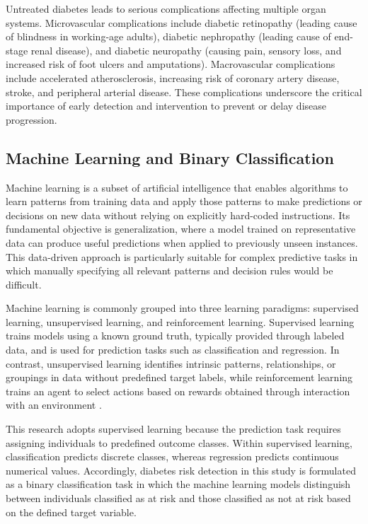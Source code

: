 Untreated diabetes leads to serious complications affecting multiple organ systems. Microvascular complications include diabetic retinopathy (leading cause of blindness in working-age adults), diabetic nephropathy (leading cause of end-stage renal disease), and diabetic neuropathy (causing pain, sensory loss, and increased risk of foot ulcers and amputations). Macrovascular complications include accelerated atherosclerosis, increasing risk of coronary artery disease, stroke, and peripheral arterial disease. These complications underscore the critical importance of early detection and intervention to prevent or delay disease progression.

\subsection{Machine Learning and Binary Classification}

Machine learning is a subset of artificial intelligence that enables algorithms to learn patterns from training data and apply those patterns to make predictions or decisions on new data without relying on explicitly hard-coded instructions. Its fundamental objective is generalization, where a model trained on representative data can produce useful predictions when applied to previously unseen instances. This data-driven approach is particularly suitable for complex predictive tasks in which manually specifying all relevant patterns and decision rules would be difficult.

Machine learning is commonly grouped into three learning paradigms: supervised learning, unsupervised learning, and reinforcement learning. Supervised learning trains models using a known ground truth, typically provided through labeled data, and is used for prediction tasks such as classification and regression. In contrast, unsupervised learning identifies intrinsic patterns, relationships, or groupings in data without predefined target labels, while reinforcement learning trains an agent to select actions based on rewards obtained through interaction with an environment \cite{ibm_machine_learning}.

This research adopts supervised learning because the prediction task requires assigning individuals to predefined outcome classes. Within supervised learning, classification predicts discrete classes, whereas regression predicts continuous numerical values. Accordingly, diabetes risk detection in this study is formulated as a binary classification task in which the machine learning models distinguish between individuals classified as at risk and those classified as not at risk based on the defined target variable.

